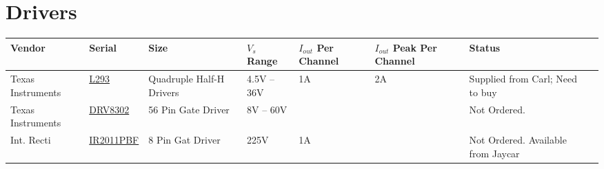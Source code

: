 \documentclass[a4paper,landscape]{article}
\begin{document}
\section{Drivers}
    {\footnotesize
    \hspace*{-6cm}\begin{tabular}{llllllll}
    \rowcolor{gray!50}
    \hline
    \textbf{Vendor}
    & \textbf{Serial}
    & \textbf{Size}
    & \textbf{$V_{s}$ Range}
    & \textbf{$I_{out}$ Per Channel}
    & \textbf{$I_{out}$ Peak Per Channel}
    & \textbf{Status}\\
    \hline
    Texas Instruments
    & \href{http://www.ti.com/lit/ds/symlink/l293d.pdf}{L293}
    & Quadruple Half-H Drivers
    & 4.5V -- 36V
    & 1A
    & 2A
    & Supplied from Carl; Need to buy\\
    Texas Instruments
    & \href{http://www.ti.com/lit/ds/symlink/drv8302.pdf}{DRV8302}
    & 56 Pin Gate Driver
    & 8V -- 60V
    &
    &
    & Not Ordered.\\
    Int. Recti
    & \href{http://www.irf.com/product-info/datasheets/data/ir2011.pdf}{IR2011PBF}
    & 8 Pin Gat Driver
    & 225V
    & 1A
    &
    & Not Ordered. Available from Jaycar\\
  \hline
  \end{tabular}}
\end{document}
